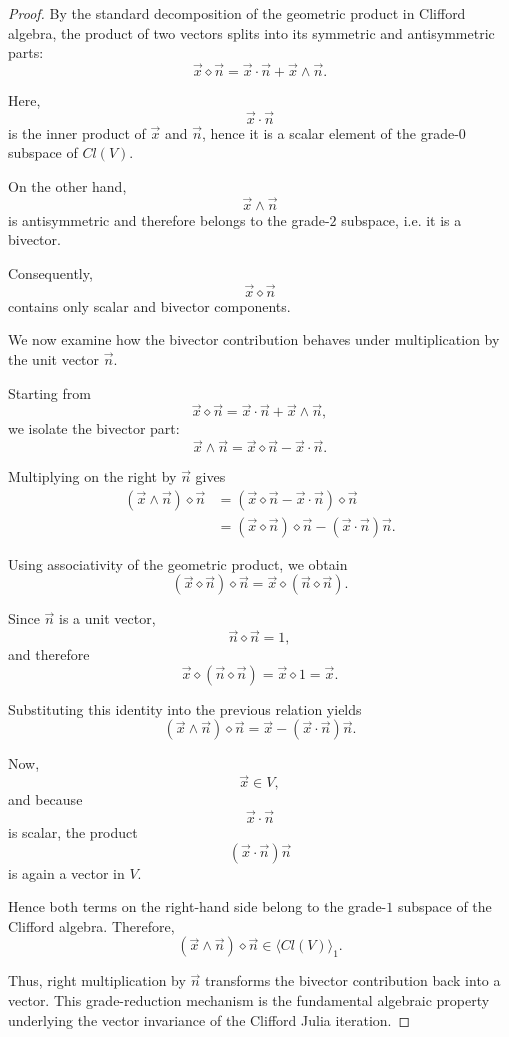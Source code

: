 \documentclass{amsart}
\theoremstyle{plain}
\numberwithin{equation}{section}
\begin{document}
\begin{proof}

By the standard decomposition of the geometric product in
Clifford algebra, the product of two vectors splits into its
symmetric and antisymmetric parts:
\[
\vec x\diamond\vec n
=
\vec x\cdot\vec n
+
\vec x\wedge\vec n.
\]

Here,
\[
\vec x\cdot\vec n
\]
is the inner product of $\vec x$ and $\vec n$, hence it is a scalar
element of the grade-$0$ subspace of $Cl(V)$.

On the other hand,
\[
\vec x\wedge\vec n
\]
is antisymmetric and therefore belongs to the grade-$2$
subspace, i.e. it is a bivector.

Consequently,
\[
\vec x\diamond\vec n
\]
contains only scalar and bivector components.

We now examine how the bivector contribution behaves under
multiplication by the unit vector $\vec n$.

Starting from
\[
\vec x\diamond\vec n
=
\vec x\cdot\vec n
+
\vec x\wedge\vec n,
\]
we isolate the bivector part:
\[
\vec x\wedge\vec n
=
\vec x\diamond\vec n
-
\vec x\cdot\vec n.
\]

Multiplying on the right by $\vec n$ gives
\begin{align*}
(\vec x\wedge\vec n)\diamond\vec n
&=
(\vec x\diamond\vec n-\vec x\cdot\vec n)\diamond\vec n \\[4pt]
&=
(\vec x\diamond\vec n)\diamond\vec n
-
(\vec x\cdot\vec n)\vec n.
\end{align*}

Using associativity of the geometric product, we obtain
\[
(\vec x\diamond\vec n)\diamond\vec n
=
\vec x\diamond(\vec n\diamond\vec n).
\]

Since $\vec n$ is a unit vector,
\[
\vec n\diamond\vec n =1,
\]
and therefore
\[
\vec x\diamond(\vec n\diamond\vec n)
=
\vec x\diamond 1
=
\vec x.
\]

Substituting this identity into the previous relation yields
\[
(\vec x\wedge\vec n)\diamond\vec n
=
\vec x
-
(\vec x\cdot\vec n)\vec n.
\]

Now,
\[
\vec x\in V,
\]
and because
\[
\vec x\cdot\vec n
\]
is scalar, the product
\[
(\vec x\cdot\vec n)\vec n
\]
is again a vector in $V$.

Hence both terms on the right-hand side belong to the
grade-$1$ subspace of the Clifford algebra. Therefore,
\[
(\vec x\wedge\vec n)\diamond\vec n
\in
\langle Cl(V)\rangle_1.
\]

Thus, right multiplication by $\vec n$ transforms the bivector
contribution back into a vector. This grade-reduction mechanism
is the fundamental algebraic property underlying the vector
invariance of the Clifford Julia iteration.

\end{proof}
\end{document}
